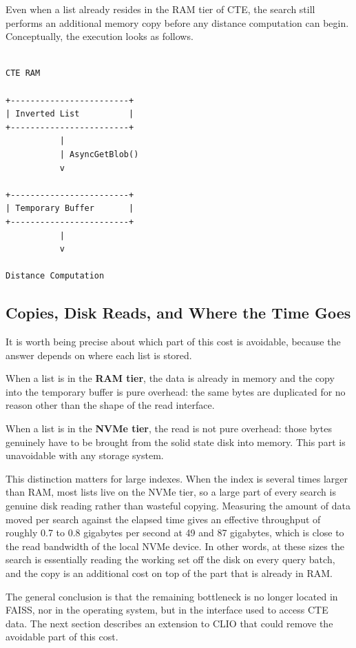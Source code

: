 \documentclass[11pt]{article}
\begin{document}
Even when a list already resides in the RAM tier of CTE, the search
still performs an additional memory copy before any distance
computation can begin. Conceptually, the execution looks as follows.

\begin{verbatim}

CTE RAM

+------------------------+
| Inverted List          |
+------------------------+
           |
           | AsyncGetBlob()
           v

+------------------------+
| Temporary Buffer       |
+------------------------+
           |
           v

Distance Computation

\end{verbatim}

\subsection{Copies, Disk Reads, and Where the Time Goes}

It is worth being precise about which part of this cost is avoidable,
because the answer depends on where each list is stored.

When a list is in the \textbf{RAM tier}, the data is already in memory
and the copy into the temporary buffer is pure overhead: the same
bytes are duplicated for no reason other than the shape of the read
interface.

When a list is in the \textbf{NVMe tier}, the read is not pure
overhead: those bytes genuinely have to be brought from the solid
state disk into memory. This part is unavoidable with any storage
system.

This distinction matters for large indexes. When the index is several
times larger than RAM, most lists live on the NVMe tier, so a large
part of every search is genuine disk reading rather than wasteful
copying. Measuring the amount of data moved per search against the
elapsed time gives an effective throughput of roughly 0.7 to 0.8
gigabytes per second at 49 and 87 gigabytes, which is close to the
read bandwidth of the local NVMe device. In other words, at these
sizes the search is essentially reading the working set off the disk
on every query batch, and the copy is an additional cost on top of the
part that is already in RAM.

The general conclusion is that the remaining bottleneck is no longer
located in FAISS, nor in the operating system, but in the interface
used to access CTE data. The next section describes an extension to
CLIO that could remove the avoidable part of this cost.
\end{document}
